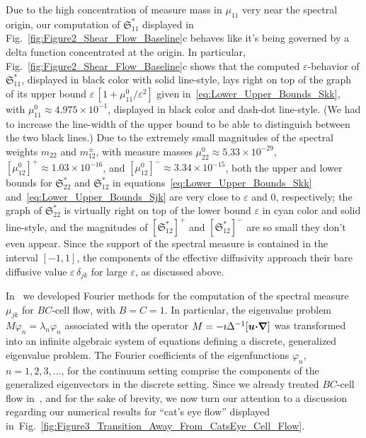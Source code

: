 \documentclass[english,12pt,jmp,graphicx]{revtex4-1}
\newcommand{\vecu}{\boldsymbol{u}}
\newcommand{\lemref}[1]{Lemma~\ref{#1}}
\newcommand{\figref}[1]{Fig.~\ref{#1}}
\newcommand{\bnabla}{\mbox{\boldmath${\nabla}$}}
\newcommand{\bcdot}{\mbox{\boldmath${\cdot}$}}
\newcommand{\Sg}{\mathfrak{S}}
\begin{document}
Due to the high concentration of measure mass in $\mu_{11}$ very near the
spectral origin, our computation of $\Sg^*_{11}$ displayed in
\figref{fig:Figure2_Shear_Flow_Baseline}c behaves like it's being
governed by a delta function concentrated at the origin. In
particular, \figref{fig:Figure2_Shear_Flow_Baseline}c shows that the
computed $\varepsilon$-behavior of $\Sg^*_{11}$, displayed in black
color with solid line-style, lays right on top of the graph
of its upper bound $\varepsilon\,[1+\mu_{11}^0/\varepsilon^2]$ given
in~\eqref{eq:Lower_Upper_Bounds_Skk}, with
$\mu_{11}^0\approx4.975\times10^{-1}$,  displayed in black color and
dash-dot line-style. (We had to increase the line-width of  the upper
bound to be able to distinguish between the two black lines.) Due to
the extremely small magnitudes of the spectral weights $m_{22}$ and
$m_{12}^\pm$, with measure masses
$\mu_{22}^0\approx5.33\times10^{-29}$, 
$[\mu_{12}^0]^+\approx1.03\times10^{-16}$, and
$[\mu_{12}^0]^-\approx3.34\times10^{-15}$, 
both the upper and lower bounds for $\Sg_{22}^*$ and $\Sg_{12}^*$ in
equations~\eqref{eq:Lower_Upper_Bounds_Skk}
and~\eqref{eq:Lower_Upper_Bounds_Sjk} are very close to
$\varepsilon$ and 0, respectively; the graph of $\Sg_{22}^*$ is virtually right on top
of the lower bound $\varepsilon$ in cyan color and solid line-style, and the
magnitudes of $[\Sg_{12}^*]^+$ and $[\Sg_{12}^*]^-$ are so small 
they don't even appear. Since the support of the spectral
measure is contained in the interval $[-1,1]$, the components of the
effective diffusivity approach their bare diffusive value
$\varepsilon\,\delta_{jk}$ for large $\varepsilon$, as discussed above. 





In~\cite{Murphy:ADSTPF-2017} we developed Fourier
methods for the computation of the spectral measure $\mu_{jk}$ for
$BC$-cell flow, with $B=C=1$. In particular, the eigenvalue problem
$M\varphi_n=\lambda_n\varphi_n$ associated with the operator
$M=-\imath\Delta^{-1}[\vecu\bcdot\bnabla]$ was 
transformed into an infinite algebraic system of equations defining a
discrete, generalized eigenvalue problem. The Fourier 
coefficients of the eigenfunctions $\varphi_n$, $n=1,2,3,\ldots$, for the
continuum setting comprise the components of the generalized
eigenvectors in the discrete setting.
Since we
already treated $BC$-cell flow in~\cite{Murphy:ADSTPF-2017}, and for
the sake of brevity, we now turn our attention to a discussion
regarding our numerical results for  ``cat's eye flow'' displayed
in~\figref{fig:Figure3_Transition_Away_From_CatsEye_Cell_Flow}.       
\end{document}
